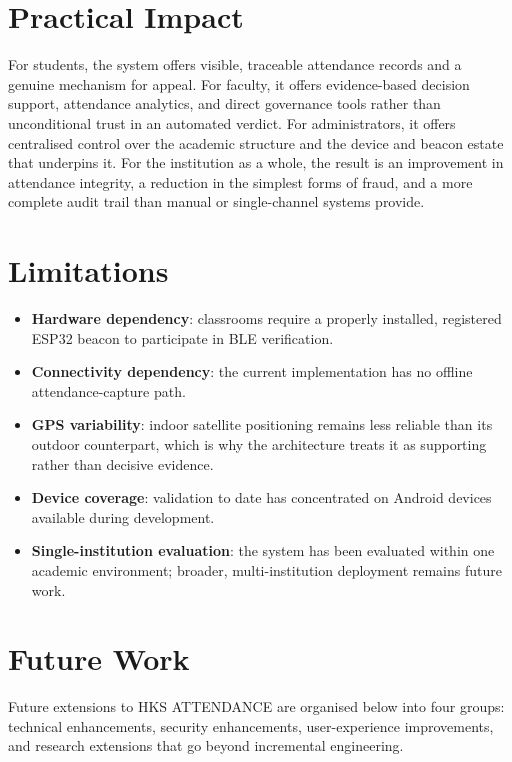 \documentclass[12pt, a4paper, oneside]{report}
\begin{document}
\section{Practical Impact}

For students, the system offers visible, traceable attendance records and a genuine mechanism for appeal. For faculty, it offers evidence-based decision support, attendance analytics, and direct governance tools rather than unconditional trust in an automated verdict. For administrators, it offers centralised control over the academic structure and the device and beacon estate that underpins it. For the institution as a whole, the result is an improvement in attendance integrity, a reduction in the simplest forms of fraud, and a more complete audit trail than manual or single-channel systems provide.

\section{Limitations}
\begin{itemize}
    \item \textbf{Hardware dependency}: classrooms require a properly installed, registered ESP32 beacon to participate in BLE verification.
    \item \textbf{Connectivity dependency}: the current implementation has no offline attendance-capture path.
    \item \textbf{GPS variability}: indoor satellite positioning remains less reliable than its outdoor counterpart, which is why the architecture treats it as supporting rather than decisive evidence.
    \item \textbf{Device coverage}: validation to date has concentrated on Android devices available during development.
    \item \textbf{Single-institution evaluation}: the system has been evaluated within one academic environment; broader, multi-institution deployment remains future work.
\end{itemize}

\section{Future Work}

Future extensions to HKS ATTENDANCE are organised below into four groups: technical enhancements, security enhancements, user-experience improvements, and research extensions that go beyond incremental engineering.
\end{document}
